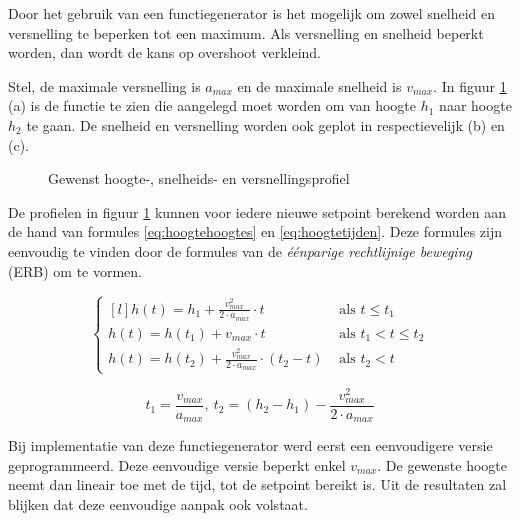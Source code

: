 \npar Door het gebruik van een functiegenerator is het mogelijk om zowel snelheid en versnelling te beperken tot een maximum. Als versnelling en snelheid beperkt worden, dan wordt de kans op overshoot verkleind. 

\npar Stel, de maximale versnelling is $a_{max}$ en de maximale snelheid is $v_{max}$. In figuur \ref{fig:hsvprofiel} (a) is de functie te zien die aangelegd moet worden om van hoogte $h_1$ naar hoogte $h_2$ te gaan. De snelheid en versnelling worden ook geplot in respectievelijk (b) en (c).

\begin{figure}[htb]
\hspace{0.01\linewidth}
\hspace{0.01\linewidth}
\caption{Gewenst hoogte-, snelheids- en versnellingsprofiel}\label{fig:hsvprofiel}
\end{figure}

\noindent De profielen in figuur \ref{fig:hsvprofiel} kunnen voor iedere nieuwe setpoint berekend worden aan de hand van formules \eqref{eq:hoogtehoogtes} en \eqref{eq:hoogtetijden}. Deze formules zijn eenvoudig te vinden door de formules van de  \textit{\'e\'enparige rechtlijnige beweging} (ERB) om te vormen.

\begin{equation}
\left\{
\begin{matrix*}[l]

h(t) = h_1 + \frac{v_{max}^2}{2 \cdot a_{max}} \cdot t & \text{ als } t \leq t_1 \\
h(t) = h(t_1) + {v_{max}} \cdot t & \text{ als } t_1 < t \leq t_2 \\
h(t) = h(t_2) + \frac{v_{max}^2}{2 \cdot a_{max}} \cdot (t_2-t) & \text{ als } t_2 < t
\end{matrix*}
\right.
\label{eq:hoogtehoogtes}
\end{equation}

\begin{equation}
t_1 = \frac{v_{max}}{a_{max}},\ 
t_2 = (h_2-h_1)-\frac{v_{max}^{2}}{2 \cdot a_{max}}
\label{eq:hoogtetijden}
\end{equation}

\npar Bij implementatie van deze functiegenerator werd eerst een eenvoudigere versie geprogrammeerd. Deze eenvoudige versie beperkt enkel $v_{max}$. De gewenste hoogte neemt dan lineair toe met de tijd, tot de setpoint bereikt is. Uit de resultaten zal blijken dat deze eenvoudige aanpak ook volstaat.

